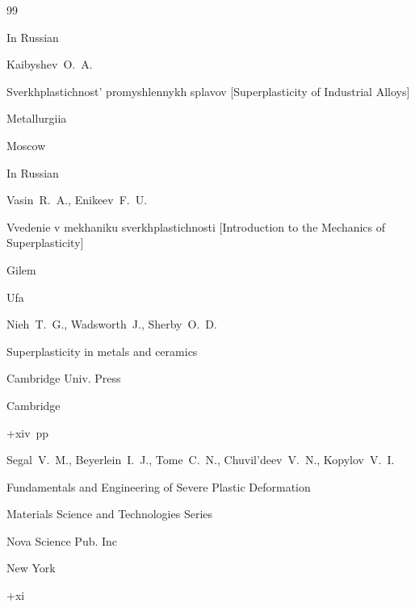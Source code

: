\begin{thebibliography}{99}

\lang In Russian

\by Kaibyshev~O.~A.

\book Sverkhplastichnost' promyshlennykh splavov \rm [Superplasticity of Industrial Alloys]


\publ Metallurgiia

\publaddr Moscow









\lang In Russian

\by Vasin~R.~A., Enikeev~F.~U.

\book Vvedenie v mekhaniku sverkhplastichnosti \rm [Introduction to the Mechanics of Superplasticity]


\publ Gilem

\publaddr Ufa









\by Nieh~T.~G., Wadsworth~J., Sherby~O.~D.

\book Superplasticity in metals and ceramics


\publ Cambridge Univ. Press

\publaddr Cambridge

+xiv~pp \nofrills







\by Segal~V.~M., Beyerlein~I.~J., Tome~C.~N., Chuvil'deev~V.~N., Kopylov~V.~I.

\book Fundamentals and Engineering of Severe Plastic Deformation


\serial Materials Science and Technologies Series

\publ Nova Science Pub. Inc

\publaddr New York

+xi






\end{thebibliography}
